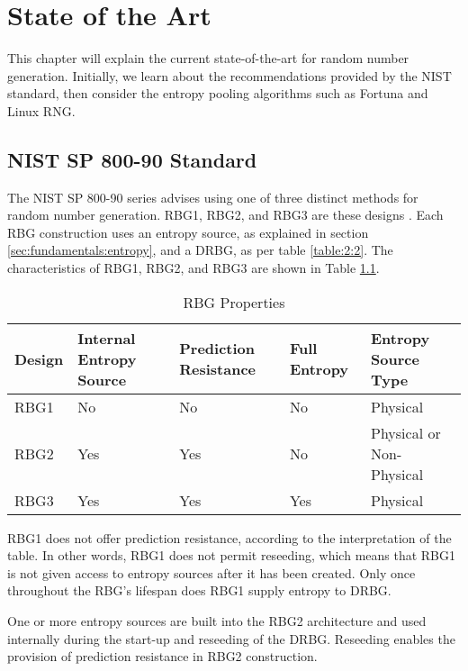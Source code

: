 \chapter{State of the Art}
\label{ch:SoA}

This chapter will explain the current state-of-the-art for random number generation. Initially, we learn about the recommendations provided by the NIST standard, then consider the entropy pooling algorithms such as Fortuna and Linux RNG.

%
%
\section{NIST SP 800-90 Standard}
\label{sec:SoA:NIST}

The NIST SP 800-90 series advises using one of three distinct methods for random number generation. RBG1, RBG2, and RBG3 are these designs \cite{SP90C-2022}. Each RBG construction uses an entropy source, as explained in section \ref{sec:fundamentals:entropy}, and a DRBG, as per table \ref{table:2:2}. The characteristics of RBG1, RBG2, and RBG3 are shown in Table \ref{table:3:1}.

\begin{table}[htbp]
	\centering
	\begin{tabular}{||p{2cm} p{2cm} p{2cm} p{2.5cm} p{2.5cm}||}
		\hline
		Design & Internal Entropy Source & Prediction Resistance & Full Entropy & Entropy Source Type
		\\ [0.3ex] 
		\hline\hline
		RBG1 & No & No & No & Physical \\
		RBG2 & Yes & Yes & No & Physical or Non-Physical\\
		RBG3 & Yes & Yes & Yes & Physical \\
		\hline
	\end{tabular}
	\caption{RBG Properties \cite{SP90C-2022}}
	\label{table:3:1}
\end{table}

RBG1 does not offer prediction resistance, according to the interpretation of the table. In other words, RBG1 does not permit reseeding, which means that RBG1 is not given access to entropy sources after it has been created. Only once throughout the RBG’s lifespan does RBG1 supply entropy to DRBG.

One or more entropy sources are built into the RBG2 architecture and used internally during the start-up and reseeding of the DRBG. Reseeding enables the provision of prediction resistance in RBG2 construction.

